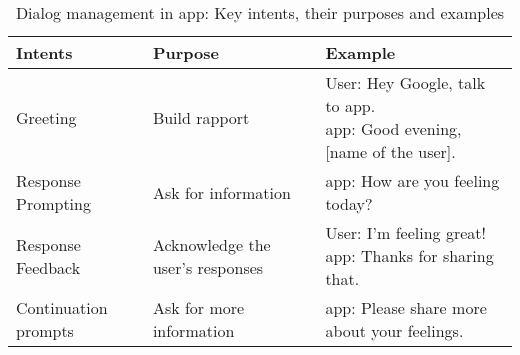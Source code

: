\begin{table}[t]
    \footnotesize
    \renewcommand{\arraystretch}{1}
    \caption{ Dialog management in \acl{app}: Key intents, their purposes and examples}
    \begin{tabular}{p{3cm} p{4cm} p{6cm} }
        \toprule 
        \textbf{Intents} & \textbf{Purpose} & \textbf{Example} \\
        \midrule
        Greeting                & Build rapport                                             & \makecell[l]{
                                                                                                            User: Hey Google, talk to \acl{app}. \\ 
                                                                                                            \acl{app}: Good evening, [name of the user]. \\ 
                                                                                                            }\\
        
        \rowcolor[gray]{.95}
        Response Prompting      & Ask for information                                       & \acl{app}: How are you feeling today? \\ 
        
        Response Feedback       & Acknowledge the user's responses                              & \makecell[l]{
                                                                                                            User: I'm feeling great! \\ 
                                                                                                            \acl{app}: Thanks for sharing that.\\
                                                                                                            }\\

        \rowcolor[gray]{.95}                        
        Continuation prompts    & Ask for more information                                  & \acl{app}: Please share more about your feelings. \\ 
        

\end{tabular}
\end{table}
